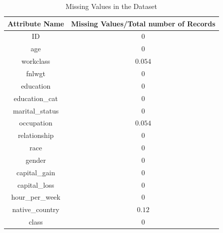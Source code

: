 \begin{table}[h]
\label{table:missing-values}
\caption{Missing Values in the Dataset}
\centering
	\begin{tabular}{| c | c |}
		\hline
		Attribute Name & Missing Values/Total number of Records\\
		\hline
		ID & $0$\\
		\hline
		age & $0$\\
		\hline
		workclass & $0.054$ \\
		\hline
		fnlwgt & $0$ \\
		\hline
		education & $0$\\
		\hline
		education\_cat & $0$\\
		\hline
		marital\_status & $0$\\
		\hline
		occupation & $0.054$ \\
		\hline
		relationship & $0$ \\
		\hline
		race & $0$ \\
		\hline
		gender & $0$ \\
		\hline
		capital\_gain & $0$ \\
		\hline
		capital\_loss & $0$ \\
		\hline
		hour\_per\_week & $0$\\
		\hline
		native\_country & $0.12$\\
		\hline
		class & $0$ \\
		\hline
	\end{tabular}
\end{table}

